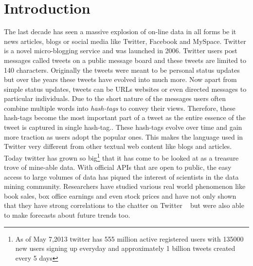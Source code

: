 \chapter{Introduction}
The last decade has seen a massive explosion of on-line data in all forms be it news articles, blogs or social media like Twitter, Facebook and MySpace.
Twitter is a novel micro-blogging service and was launched in 2006.
Twitter users post messages called tweets on a public message board  and these tweets are limited to 140 characters.
Originally the tweets were meant to be personal status updates but over the years these tweets have evolved into much more.
Now apart from simple status updates, tweets can be URLs websites or even directed messages to particular individuals.
Due to the short nature of the messages users often combine multiple words into \emph{hash-tags} to convey their views.
Therefore, these hash-tags become the most important part of a tweet as the entire essence of the tweet is captured in single hash-tag.. 
These hash-tags evolve over time and gain more traction as users adopt the popular ones.
This makes the language used in Twitter very different from other textual web content like blogs and articles.
\newline
Today twitter has grown so big\footnote{As of May 7,2013 twitter has 555 million active registered users with 135000 new users signing up everyday and approximately 1 billion tweets created every 5 days}
that it has come to be looked at as a treasure trove of mine-able data.
With official APIs that are open to public, the easy access to large volumes of data has piqued the interest of scientists in the data mining community.
Researchers have studied various real world phenomenon like book sales, box office earnings and even stock prices and have not only shown that they have  strong correlations to the chatter on Twitter ~\cite{gruhl2005predictive,asur2010predicting,bollen2011twitter}
but were also able to make forecasts about future trends too.
